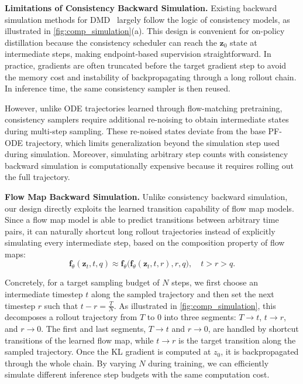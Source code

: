 \documentclass{llmxive}
\providecommand{\myPara}[1]{\noindent\textbf{#1}}
\begin{document}
\myPara{Limitations of Consistency Backward Simulation.}
Existing backward simulation methods for DMD~\cite{huang2025selfforcing, zheng2025large} largely follow the logic of consistency models, as illustrated in \cref{fig:comp_simulation}(a). This design is convenient for on-policy distillation because the consistency scheduler can reach the $\mathbf{z}_0$ state at intermediate steps, making endpoint-based supervision straightforward. In practice, gradients are often truncated before the target gradient step to avoid the memory cost and instability of backpropagating through a long rollout chain. In inference time, the same consistency sampler is then reused.

However, unlike ODE trajectories learned through flow-matching pretraining, consistency samplers require additional re-noising to obtain intermediate states during multi-step sampling. These re-noised states deviate from the base PF-ODE trajectory, which limits generalization beyond the simulation step used during simulation. Moreover, simulating arbitrary step counts with consistency backward simulation is computationally expensive because it requires rolling out the full trajectory.

\myPara{Flow Map Backward Simulation.}
Unlike consistency backward simulation, our design directly exploits the learned transition capability of flow map models. Since a flow map model is able to predict transitions between arbitrary time pairs, it can naturally shortcut long rollout trajectories instead of explicitly simulating every intermediate step, based on the composition property of flow maps:
\begin{equation}
  \mathbf{f}_{\theta}(\mathbf{z}_t,t,q) \approx \mathbf{f}_{\theta}\big(\mathbf{f}_{\theta}(\mathbf{z}_t,t,r),r,q\big), \quad t>r>q.
\end{equation}

Concretely, for a target sampling budget of $N$ steps, we first choose an intermediate timestep $t$ along the sampled trajectory and then set the next timestep $r$ such that $t-r = \frac{T}{N}$. As illustrated in \cref{fig:comp_simulation}, this decomposes a rollout trajectory from $T$ to $0$ into three segments: $T \to t$, $t \to r$, and $r \to 0$. The first and last segments, $T \to t$ and $r \to 0$, are handled by shortcut transitions of the learned flow map, while $t \to r$ is the target transition along the sampled trajectory. Once the KL gradient is computed at $z_0$, it is backpropagated through the whole chain. By varying $N$ during training, we can efficiently simulate different inference step budgets with the same computation cost.
\end{document}
